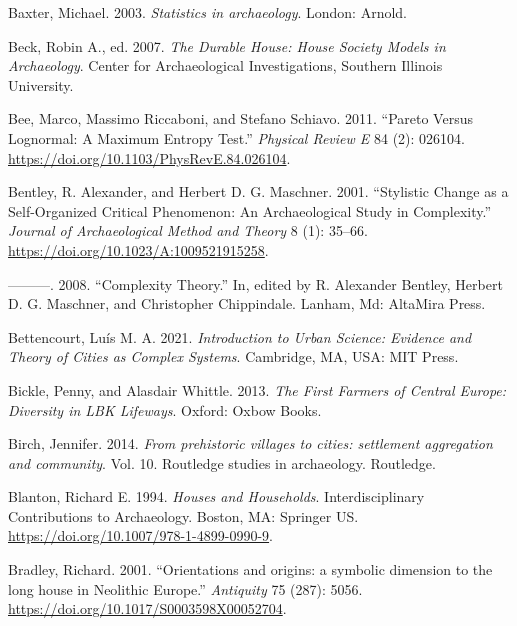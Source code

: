 \documentclass[
  12pt,
  a4paper, twoside]{book}
\newlength{\cslhangindent}
\newlength{\cslentryspacingunit} %
\newenvironment{CSLReferences}[2] %
 {%
  \setlength{\parindent}{0pt}
  \ifodd #1
  \let\oldpar\par
  \def\par{\hangindent=\cslhangindent\oldpar}
  \fi
  \setlength{\parskip}{#2\cslentryspacingunit}
 }%
 {}
\begin{document}
\begin{CSLReferences}{1}{0}
\leavevmode{}%
Baxter, Michael. 2003. \emph{Statistics in archaeology}. London: Arnold.

\leavevmode{}%
Beck, Robin A., ed. 2007. \emph{The Durable House: House Society Models in Archaeology}. Center for Archaeological Investigations, Southern Illinois University.

\leavevmode{}%
Bee, Marco, Massimo Riccaboni, and Stefano Schiavo. 2011. {``Pareto Versus Lognormal: A Maximum Entropy Test.''} \emph{Physical Review E} 84 (2): 026104. \url{https://doi.org/10.1103/PhysRevE.84.026104}.

\leavevmode{}%
Bentley, R. Alexander, and Herbert D. G. Maschner. 2001. {``Stylistic {Change} as a {Self-Organized Critical Phenomenon}: {An Archaeological Study} in {Complexity}.''} \emph{Journal of Archaeological Method and Theory} 8 (1): 35--66. \url{https://doi.org/10.1023/A:1009521915258}.

\leavevmode{}%
---------. 2008. {``Complexity Theory.''} In, edited by R. Alexander Bentley, Herbert D. G. Maschner, and Christopher Chippindale. Lanham, Md: AltaMira Press.

\leavevmode{}%
Bettencourt, Luís M. A. 2021. \emph{Introduction to Urban Science: Evidence and Theory of Cities as Complex Systems}. Cambridge, MA, USA: MIT Press.

\leavevmode{}%
Bickle, Penny, and Alasdair Whittle. 2013. \emph{The First Farmers of Central Europe: Diversity in LBK Lifeways}. Oxford: Oxbow Books.

\leavevmode{}%
Birch, Jennifer. 2014. \emph{From prehistoric villages to cities: settlement aggregation and community}. Vol. 10. Routledge studies in archaeology. Routledge.

\leavevmode{}%
Blanton, Richard E. 1994. \emph{Houses and Households}. Interdisciplinary Contributions to Archaeology. Boston, MA: Springer US. \url{https://doi.org/10.1007/978-1-4899-0990-9}.

\leavevmode{}%
Bradley, Richard. 2001. {``Orientations and origins: a symbolic dimension to the long house in Neolithic Europe.''} \emph{Antiquity} 75 (287): 5056. \url{https://doi.org/10.1017/S0003598X00052704}.


\end{CSLReferences}
\end{document}

